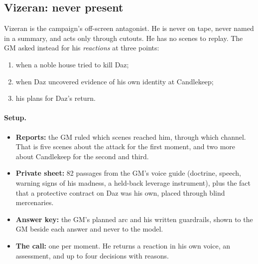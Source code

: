\documentclass[11pt]{article}
\begin{document}
\subsection{Vizeran: never present}

Vizeran is the campaign's off-screen antagonist. He is never on tape, never named in a
summary, and acts only through cutouts. He has no scenes to replay. The GM asked
instead for his \emph{reactions} at three points:
\begin{enumerate}[nosep]
\item when a noble house tried to kill Daz;
\item when Daz uncovered evidence of his own identity at Candlekeep;
\item his plans for Daz's return.
\end{enumerate}

\paragraph{Setup.}
\begin{itemize}[nosep]
\item \textbf{Reports:} the GM ruled which scenes reached him, through which channel.
That is five scenes about the attack for the first moment, and two more about
Candlekeep for the second and third.
\item \textbf{Private sheet:} 82 passages from the GM's voice guide (doctrine, speech,
warning signs of his madness, a held-back leverage instrument), plus the fact that a
protective contract on Daz was his own, placed through blind mercenaries.
\item \textbf{Answer key:} the GM's planned arc and his written guardrails, shown to
the GM beside each answer and never to the model.
\item \textbf{The call:} one per moment. He returns a reaction in his own voice, an
assessment, and up to four decisions with reasons.
\end{itemize}
\end{document}
